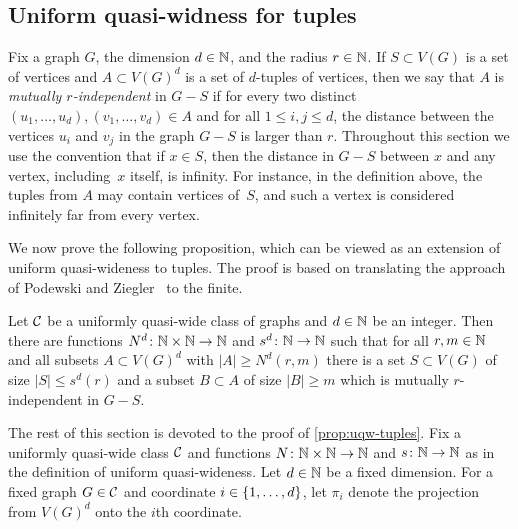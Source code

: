 \subsection{Uniform quasi-widness for tuples}\label{sec:uqw-tuples}
Fix a graph $G$, the dimension $d\in\N$, and the radius $r\in \N$.
If $S\subset V(G)$ is a set of vertices and $A\subset V(G)^d$ is a set of $d$-tuples of vertices,
then we say that $A$ is \emph{mutually $r$-independent} in $G-S$ 
if for every two distinct $(u_1,\ldots,u_d),(v_1,\ldots,v_d)\in A$
and for all $1\le i,j\le d$, the distance between the vertices $u_i$ and $v_j$ in the graph $G-S$
is larger than $r$. Throughout this section we use the convention that if $x\in S$, then the distance in $G-S$ between $x$ and any vertex, including~$x$ itself, is infinity. 
For instance, in the definition above, the tuples from $A$ may contain vertices of~$S$, and such a vertex is considered infinitely far from every vertex.

We now prove the following proposition, which can be viewed as an extension of uniform quasi-wideness to tuples.
The proof is based on translating the approach of Podewski and Ziegler~\cite{podewski1978stable} to the finite.

\begin{proposition}\label{prop:uqw-tuples}
	Let $\cal C$ be a uniformly quasi-wide class of graphs and $d\in\N$ be an integer.
	Then there are functions $N^d\colon \N\times\N\to\N$ and $s^d\colon \N\to\N$
	such that for all $r,m\in\N$ and all subsets $A\subset V(G)^d$
	with $|A|\ge N^d(r,m)$ there  is a set $S\subset V(G)$
	of size $|S|\le s^d(r)$ and a subset $B\subset A$ of size $|B|\ge m$ which is mutually $r$-independent in $G-S$.
\end{proposition}

The rest of this section is devoted to the proof of \cref{prop:uqw-tuples}.
Fix a uniformly quasi-wide class $\cal C$ and functions $N\colon \N\times\N\to \N$
	and $s\colon \N\to\N$ as in the definition of uniform quasi-wideness.
	Let $d\in \N$ be a fixed dimension.
		For a fixed graph $G\in \cal C$  and
	  coordinate $i\in\set{1,\ldots,d}$, let $\pi_i$ denote the projection from $V(G)^d$ onto the $i$th coordinate.

	


